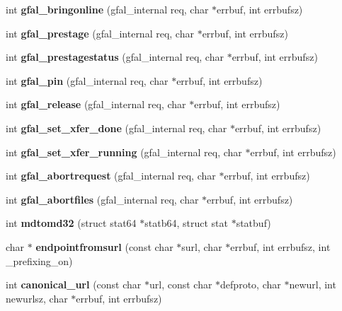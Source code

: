 \begin{CompactItemize}
\item 
int \textbf{gfal\_\-bringonline} (gfal\_\-internal req, char $\ast$errbuf, int errbufsz)\label{gfal__common_8c_dafd89750e4d0a86149e95cfab51586a}

\item 
int \textbf{gfal\_\-prestage} (gfal\_\-internal req, char $\ast$errbuf, int errbufsz)\label{gfal__common_8c_ec2097ecb2aadb209c713a9c2b1d4384}

\item 
int \textbf{gfal\_\-prestagestatus} (gfal\_\-internal req, char $\ast$errbuf, int errbufsz)\label{gfal__common_8c_64e77a525710c0ffd5def90f8aef3f8a}

\item 
int \textbf{gfal\_\-pin} (gfal\_\-internal req, char $\ast$errbuf, int errbufsz)\label{gfal__common_8c_b149b326996828f815afc9f004057ec1}

\item 
int \textbf{gfal\_\-release} (gfal\_\-internal req, char $\ast$errbuf, int errbufsz)\label{gfal__common_8c_229fde0a465692ab8b0ed3fec2ebc29a}

\item 
int \textbf{gfal\_\-set\_\-xfer\_\-done} (gfal\_\-internal req, char $\ast$errbuf, int errbufsz)\label{gfal__common_8c_946427a964fb84234ace8d3a2fdc29f3}

\item 
int \textbf{gfal\_\-set\_\-xfer\_\-running} (gfal\_\-internal req, char $\ast$errbuf, int errbufsz)\label{gfal__common_8c_25eed083011cdc1cb50910548ff69c8e}

\item 
int \textbf{gfal\_\-abortrequest} (gfal\_\-internal req, char $\ast$errbuf, int errbufsz)\label{gfal__common_8c_aca24e1095b862293529fec208518384}

\item 
int \textbf{gfal\_\-abortfiles} (gfal\_\-internal req, char $\ast$errbuf, int errbufsz)\label{gfal__common_8c_37f6d2d8ea0ad96d32e8542bd59adf63}

\item 
int \textbf{mdtomd32} (struct stat64 $\ast$statb64, struct stat $\ast$statbuf)\label{gfal__common_8c_cd29b5992fa6526c74fa4d1fb630a02d}

\item 
char $\ast$ \textbf{endpointfromsurl} (const char $\ast$surl, char $\ast$errbuf, int errbufsz, int \_\-prefixing\_\-on)\label{gfal__common_8c_fb27343aaad36ce664aa6a26cac94fc2}

\item 
int \textbf{canonical\_\-url} (const char $\ast$url, const char $\ast$defproto, char $\ast$newurl, int newurlsz, char $\ast$errbuf, int errbufsz)\label{gfal__common_8c_951b857d6ce43fd8a8914844b5de559a}


\end{CompactItemize}
